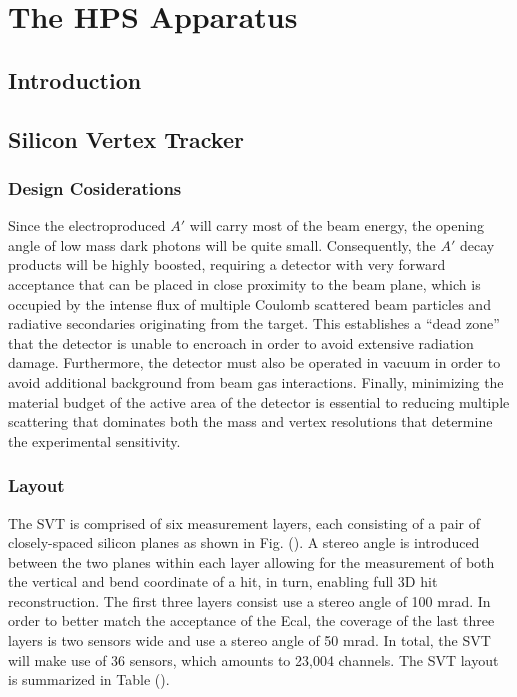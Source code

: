 
\chapter{The HPS Apparatus}

\section{Introduction}

\section*{Silicon Vertex Tracker}

\subsection*{Design Cosiderations}

Since the electroproduced $A'$ will carry most of the beam energy, the opening
angle of low mass dark photons will be quite small.  Consequently, the $A'$ 
decay products will be highly boosted, requiring a detector with very forward
acceptance that can be placed in close proximity to the beam plane, which is
occupied by the intense flux of multiple Coulomb scattered beam particles and
radiative secondaries originating from the target.  This establishes a 
``dead zone'' that the detector  is unable to encroach in  order  to avoid  
extensive  radiation damage.  Furthermore, the detector must also be operated 
in vacuum in order to avoid additional background from beam gas interactions.
Finally, minimizing the material budget of the active area of the detector is
essential to reducing multiple scattering that dominates both the mass and 
vertex resolutions that determine the experimental sensitivity.

\subsection*{Layout}

The SVT is comprised of six measurement layers, each consisting of a pair of
closely-spaced silicon planes as shown in Fig. ().  A stereo angle is 
introduced between the two planes within each layer allowing for the 
measurement of both the vertical and bend coordinate of a hit, in turn, 
enabling full 3D hit reconstruction.  The first three layers consist use
a stereo angle of 100 mrad. In order to better match the acceptance of the 
Ecal, the coverage of the last three layers is two sensors wide and use a 
stereo angle of 50 mrad.  In total, the SVT will make use of 36 sensors, which
amounts to 23,004 channels.  The SVT layout is summarized in Table ().


